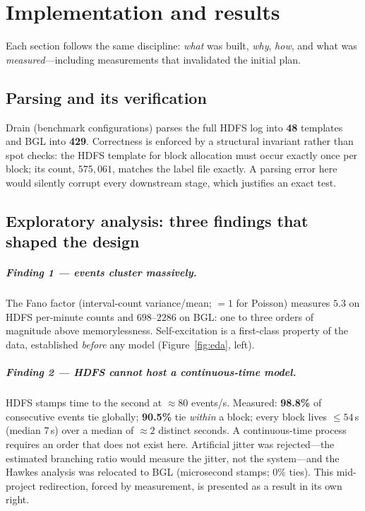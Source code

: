 \documentclass[11pt,a4paper]{report}
\begin{document}
\chapter{Implementation and results}
\label{ch:implementation}

Each section follows the same discipline: \emph{what} was built, \emph{why},
\emph{how}, and what was \emph{measured}---including measurements that
invalidated the initial plan.

\section{Parsing and its verification}
\label{sec:impl-parsing}
Drain (benchmark configurations) parses the full HDFS log into
\textbf{48} templates and BGL into \textbf{429}. Correctness is enforced by
a structural invariant rather than spot checks: the HDFS template for block
allocation must occur exactly once per block; its count, $575{,}061$,
matches the label file exactly. A parsing error here would silently corrupt
every downstream stage, which justifies an exact test.

\section{Exploratory analysis: three findings that shaped the design}
\label{sec:impl-eda}

\paragraph{Finding 1 --- events cluster massively.} The Fano factor
(interval-count variance/mean; $=1$ for Poisson) measures $5.3$ on HDFS
per-minute counts and $698$--$2286$ on BGL: one to three orders of
magnitude above memorylessness. Self-excitation is a first-class property
of the data, established \emph{before} any model
(Figure~\ref{fig:eda}, left).

\paragraph{Finding 2 --- HDFS cannot host a continuous-time model.} HDFS
stamps time to the second at $\approx80$ events/s. Measured: \textbf{98.8\%}
of consecutive events tie globally; \textbf{90.5\%} tie \emph{within} a
block; every block lives $\le54$\,s (median 7\,s) over a median of
$\approx2$ distinct seconds. A continuous-time process requires an order
that does not exist here. Artificial jitter was rejected---the estimated
branching ratio would measure the jitter, not the system---and the Hawkes
analysis was relocated to BGL (microsecond stamps; $0\%$ ties). This
mid-project redirection, forced by measurement, is presented as a result in
its own right.
\end{document}
